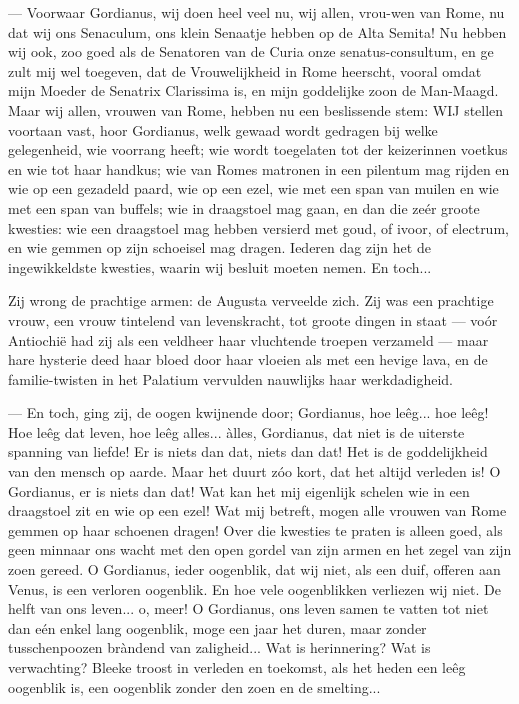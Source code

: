 \documentclass[a4paper, 12pt, oneside, dutch]{article}
\begin{document}
--- Voorwaar Gordianus, wij doen heel veel nu, wij allen, vrou-wen van Rome, nu dat wij ons Senaculum, ons klein Senaatje hebben op de Alta Semita! Nu hebben wij ook, zoo goed als de Senatoren van de Curia onze senatus-consultum, en ge zult mij wel toegeven, dat de Vrouwelijkheid in Rome heerscht, vooral omdat mijn Moeder de Senatrix Clarissima is, en mijn goddelijke zoon de Man-Maagd. Maar wij allen, vrouwen van Rome, hebben nu een beslissende stem: WIJ stellen voortaan vast, hoor Gordianus, welk gewaad wordt gedragen bij welke gelegenheid, wie voorrang heeft; wie wordt toegelaten tot der keizerinnen voetkus en wie tot haar handkus; wie van Romes matronen in een pilentum mag rijden en wie op een gezadeld paard, wie op een ezel, wie met een span van muilen en wie met een span van buffels; wie in draagstoel mag gaan, en dan die zeér groote kwesties: wie een draagstoel mag hebben versierd met goud, of ivoor, of electrum, en wie gemmen op zijn schoeisel mag dragen. Iederen dag zijn het de ingewikkeldste kwesties, waarin wij besluit moeten nemen. En toch...

Zij wrong de prachtige armen: de Augusta verveelde zich. Zij was een prachtige vrouw, een vrouw tintelend van levenskracht, tot groote dingen in staat --- voór Antiochië had zij als een veldheer haar vluchtende troepen verzameld --- maar hare hysterie deed haar bloed door haar vloeien als met een hevige lava, en de familie-twisten in het Palatium vervulden nauwlijks haar werkdadigheid.

--- En toch, ging zij, de oogen kwijnende door; Gordianus, hoe leêg... hoe leêg! Hoe leêg dat leven, hoe leêg alles... àlles, Gordianus, dat niet is de uiterste spanning van liefde! Er is niets dan dat, niets dan dat! Het is de goddelijkheid van den mensch op aarde. Maar het duurt zóo kort, dat het altijd verleden is! O Gordianus, er is niets dan dat! Wat kan het mij eigenlijk schelen wie in een draagstoel zit en wie op een ezel! Wat mij betreft, mogen alle vrouwen van Rome gemmen op haar schoenen dragen! Over die kwesties te praten is alleen goed, als geen minnaar ons wacht met den open gordel van zijn armen en het zegel van zijn zoen gereed. O Gordianus, ieder oogenblik, dat wij niet, als een duif, offeren aan Venus, is een verloren oogenblik. En hoe vele oogenblikken verliezen wij niet. De helft van ons leven... o, meer! O Gordianus, ons leven samen te vatten tot niet dan eén enkel lang oogenblik, moge een jaar het duren, maar zonder tusschenpoozen bràndend van zaligheid... Wat is herinnering? Wat is verwachting? Bleeke troost in verleden en toekomst, als het heden een leêg oogenblik is, een oogenblik zonder den zoen en de smelting...
\end{document}

